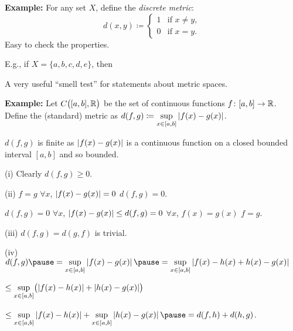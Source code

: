 \documentclass[10pt,aspectratio=149]{beamer}
\begin{document}
\begin{frame}

\textbf{Example:}
For any set $X$, define the \emph{discrete metric}:
\begin{equation*}
d(x,y) \coloneqq
\begin{cases}
1 & \text{if } x \not= y, \\
0 & \text{if } x = y.
\end{cases}
\end{equation*}
\pause
Easy to check the properties.

\pause
\medskip

E.g., if $X = \{ a,b,c,d,e \}$, then

\begin{center}
\end{center}

\pause
A very useful 
``smell test'' for statements about metric spaces.
\end{frame}

\begin{frame}

\textbf{Example:}
Let $C\bigl([a,b],{\mathbb{R}}\bigr)$ be the set of
continuous functions $f \colon [a,b] \to {\mathbb{R}}$.
\pause
Define the (standard) metric as
\qquad $
d(f,g) \coloneqq \sup\limits_{x \in [a,b]} \left\lvert {f(x)-g(x)} \right\rvert$.

\pause
\medskip

$d(f,g)$ is finite as $\left\lvert {f(x)-g(x)} \right\rvert$ is a continuous function on a closed bounded interval
$[a,b]$ and so bounded.

\pause
\medskip

(i) \quad Clearly $d(f,g) \geq 0$. 

\pause
\medskip

(ii) \quad $f = g$
\pause
\wthus $\forall x$, $\left\lvert {f(x)-g(x)} \right\rvert = 0$
\pause
\wthus $d(f,g) = 0$.

\pause
\phantom{(ii)}\quad
$d(f,g) = 0$
\pause
\hfill\thus\hfill $\forall x$, $\left\lvert {f(x)-g(x)} \right\rvert \leq d(f,g) = 0$
\pause
\hfill\thus\hfill
$\forall x$,
$f(x) = g(x)$
\pause
\hfill\thus\hfill
$f=g$.

\pause
\medskip

(iii) \quad $d(f,g) = d(g,f)$ is trivial.

\pause
\medskip

(iv)
\quad
$
d(f,g)
\pause
=
\sup\limits_{x \in [a,b]} \abs{f(x)-g(x)}
\pause
=
\sup\limits_{x \in [a,b]} \abs{f(x)-h(x)+h(x)-g(x)}
$

\pause
\medskip

\qquad
\qquad
$
\leq
\sup\limits_{x \in [a,b]} \bigl( \left\lvert {f(x)-h(x)} \right\rvert+\left\lvert {h(x)-g(x)} \right\rvert \bigr)
$

\pause
\medskip

\qquad
\qquad
$
\leq
\sup\limits_{x \in [a,b]} \abs{f(x)-h(x)}+
\sup\limits_{x \in [a,b]} \abs{h(x)-g(x)}
\pause
= d(f,h) + d(h,g)$.

\end{frame}
\end{document}
